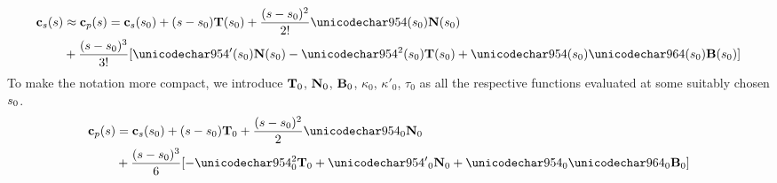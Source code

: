 \begin{equation}
\begin{split}
 \sats(\parm)&\approx\satp(\parm) = \sats(\parm_0) + (s-\parm_0)\vct{T}(\parm_0) + \frac{(s-\parm_0)^2}{2!}\kappa(\parm_0)\vct{N}(\parm_0)\\
 &+ \frac{(s-\parm_0)^3}{3!}[\kappa'(\parm_0)\vct{N}(\parm_0) -\kappa^2(\parm_0)\vct{T}(\parm_0)+\kappa(\parm_0)\tau(\parm_0)\vct{B}(\parm_0)]
\end{split}
\end{equation}
To make the notation more compact, we introduce $\mathbf{T}_0$, $\mathbf{N}_0$, $\mathbf{B}_0$, $\kappa_0$, ${\kappa'}_0$, $\tau_0$ as all the respective functions evaluated at some suitably chosen $s_0$.
\begin{equation}
\begin{split}
 \satp(\parm) &= \sats(\parm_0) + (\parm-\parm_0)\vct{T}_0 +  \frac{(\parm-\parm_0)^2}{2}\kappa_0\vct{N}_0\\
 &+ \frac{(\parm-\parm_0)^3}{6}[-\kappa^2_0\vct{T}_0 + {\kappa'}_0\vct{N}_0 + \kappa_0\tau_0\vct{B}_0]
 \end{split}
 \label{eq:diffgeoeqn}
\end{equation}
